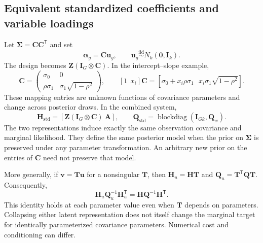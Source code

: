 \documentclass[11pt]{article}
\newcommand{\bu}{\bm{u}}
\newcommand{\bv}{\bm{v}}
\newcommand{\balpha}{\bm{\alpha}}
\newcommand{\bA}{\bm{A}}
\newcommand{\bC}{\bm{C}}
\newcommand{\bH}{\bm{H}}
\newcommand{\bI}{\bm{I}}
\newcommand{\bQ}{\bm{Q}}
\newcommand{\bT}{\bm{T}}
\newcommand{\bZ}{\bm{Z}}
\newcommand{\bSigma}{\bm{\Sigma}}
\newcommand{\bzero}{\bm{0}}
\newcommand{\trans}{^{\mathsf T}}
\DeclareMathOperator{\blockdiag}{blockdiag}
\begin{document}
\subsection{Equivalent standardized coefficients and variable loadings}
Let $\bSigma=\bC\bC\trans$ and set
\begin{equation}\label{eq:standardize}
 \balpha_g=\bC\bu_g,\qquad \bu_g\stackrel{\mathrm{iid}}{\sim}N_k(\bzero,\bI_k).
\end{equation}
The design becomes $\bZ(\bI_G\otimes\bC)$. In the intercept--slope example,
\begin{equation}\label{eq:variable-row}
 \bC=\begin{pmatrix}
 \sigma_0&0\\\rho\sigma_1&\sigma_1\sqrt{1-\rho^2}
 \end{pmatrix},\qquad
 [1\ \ x_i]\bC=
 [\sigma_0+x_i\rho\sigma_1\ \ \ x_i\sigma_1\sqrt{1-\rho^2}].
\end{equation}
These mapping entries are unknown functions of covariance parameters and change
across posterior draws. In the combined system,
\begin{equation}
 \bH_{\mathrm{std}}=[\bZ(\bI_G\otimes\bC)\ \bA],\qquad
 \bQ_{\mathrm{std}}=\blockdiag(\bI_{Gk},\bQ_w).
\end{equation}
The two representations induce exactly the same observation covariance and
marginal likelihood. They define the same posterior model when the prior on
$\bSigma$ is preserved under any parameter transformation. An arbitrary new prior
on the entries of $\bC$ need not preserve that model.

More generally, if $\bv=\bT\bu$ for a nonsingular $\bT$, then
$\bH_u=\bH\bT$ and $\bQ_u=\bT\trans\bQ\bT$. Consequently,
\begin{equation}\label{eq:invariance}
 \bH_u\bQ_u^{-1}\bH_u\trans=\bH\bQ^{-1}\bH\trans.
\end{equation}
This identity holds at each parameter value even when $\bT$ depends on parameters.
Collapsing either latent representation does not itself change the marginal
target for identically parameterized covariance parameters. Numerical cost and
conditioning can differ.
\end{document}
